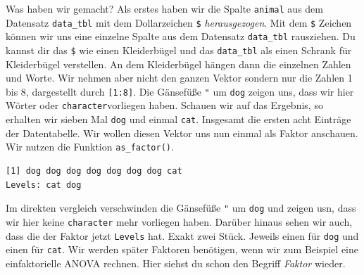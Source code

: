 \documentclass[
  letterpaper,
  DIV=11,
  oneside]{scrreport}
\newenvironment{Shaded}{\begin{snugshade}}{\end{snugshade}}
\newcommand{\DecValTok}[1]{\textcolor[rgb]{0.68,0.00,0.00}{#1}}
\newcommand{\FunctionTok}[1]{\textcolor[rgb]{0.28,0.35,0.67}{#1}}
\newcommand{\NormalTok}[1]{\textcolor[rgb]{0.00,0.23,0.31}{#1}}
\newcommand{\SpecialCharTok}[1]{\textcolor[rgb]{0.37,0.37,0.37}{#1}}
\begin{document}
Was haben wir gemacht? Als erstes haben wir die Spalte \texttt{animal}
aus dem Datensatz \texttt{data\_tbl} mit dem Dollarzeichen \texttt{\$}
\emph{herausgezogen}. Mit dem \texttt{\$} Zeichen können wir uns eine
einzelne Spalte aus dem Datensatz \texttt{data\_tbl} rausziehen. Du
kannst dir das \texttt{\$} wie einen Kleiderbügel und das
\texttt{data\_tbl} als einen Schrank für Kleiderbügel verstellen. An dem
Kleiderbügel hängen dann die einzelnen Zahlen und Worte. Wir nehmen aber
nicht den ganzen Vektor sondern nur die Zahlen 1 bis 8, dargestellt
durch \texttt{{[}1:8{]}}. Die Gänsefüße \texttt{"} um \texttt{dog}
zeigen uns, dass wir hier Wörter oder \texttt{character}vorliegen haben.
Schauen wir auf das Ergebnis, so erhalten wir sieben Mal \texttt{dog}
und einmal \texttt{cat}. Insgesamt die ersten acht Einträge der
Datentabelle. Wir wollen diesen Vektor uns nun einmal als Faktor
anschauen. Wir nutzen die Funktion \texttt{as\_factor()}.
{}

\begin{Shaded}
\end{Shaded}

\begin{verbatim}
[1] dog dog dog dog dog dog dog cat
Levels: cat dog
\end{verbatim}

Im direkten vergleich verschwinden die Gänsefüße \texttt{"} um
\texttt{dog} und zeigen usn, dass wir hier keine \texttt{character} mehr
vorliegen haben. Darüber hinaus sehen wir auch, dass die der Faktor
jetzt \texttt{Levels} hat. Exakt zwei Stück. Jeweils einen für
\texttt{dog} und einen für \texttt{cat}. Wir werden später Faktoren
benötigen, wenn wir zum Beispiel eine einfaktorielle ANOVA rechnen. Hier
siehst du schon den Begriff \emph{Faktor} wieder.

\end{document}
